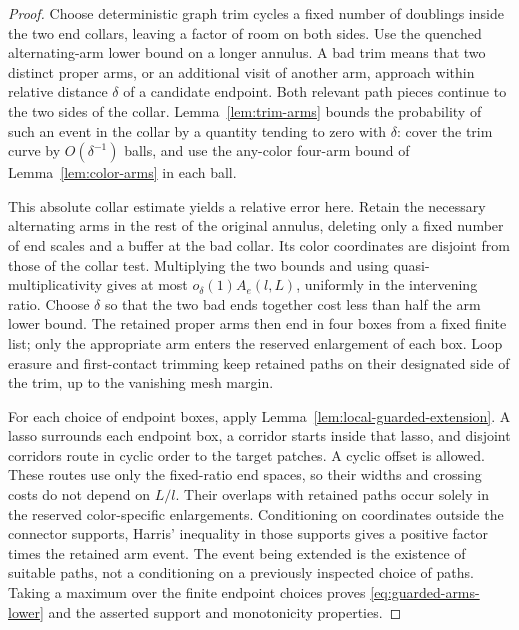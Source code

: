 \begin{proof}
Choose deterministic graph trim cycles a fixed number of doublings inside
the two end collars, leaving a factor of room on both sides.  Use the
quenched alternating-arm lower bound on a longer annulus.  A bad trim
means that two distinct proper arms, or an additional visit of another
arm, approach within relative distance $\delta$ of a candidate endpoint.
Both relevant path pieces continue to the two sides of the collar.
Lemma~\ref{lem:trim-arms} bounds the probability of such an event in the
collar by a quantity tending to zero with $\delta$: cover the trim curve
by $O(\delta^{-1})$ balls, and use the any-color four-arm bound of
Lemma~\ref{lem:color-arms} in each ball.

This absolute collar estimate yields a relative error here.  Retain the
necessary alternating arms in the rest of the original annulus, deleting
only a fixed number of end scales and a buffer at the bad collar.  Its
color coordinates are disjoint from those of the collar test.  Multiplying
the two bounds and using quasi-multiplicativity gives at most
$o_\delta(1)A_e(l,L)$, uniformly in the intervening ratio.  Choose $\delta$
so that the two bad ends together cost less than half the arm lower
bound.  The retained proper arms then end in four boxes from a fixed
finite list; only the appropriate arm enters the reserved enlargement
of each box.  Loop erasure and first-contact trimming keep retained paths
on their designated side of the trim, up to the vanishing mesh margin.

For each choice of endpoint boxes, apply
Lemma~\ref{lem:local-guarded-extension}.  A lasso surrounds each endpoint
box, a corridor starts inside that lasso, and disjoint corridors route
in cyclic order to the target patches.  A cyclic offset is allowed.
These routes use only the fixed-ratio end spaces, so their widths and
crossing costs do not depend on $L/l$.  Their overlaps with retained
paths occur solely in the reserved color-specific enlargements.
Conditioning on coordinates outside the connector supports, Harris'
inequality in those supports gives a positive factor times the retained
arm event.  The event being extended is the existence of suitable paths,
not a conditioning on a previously inspected choice of paths.  Taking
a maximum over the finite endpoint choices proves
\eqref{eq:guarded-arms-lower} and the asserted support and monotonicity
properties.
\end{proof}

